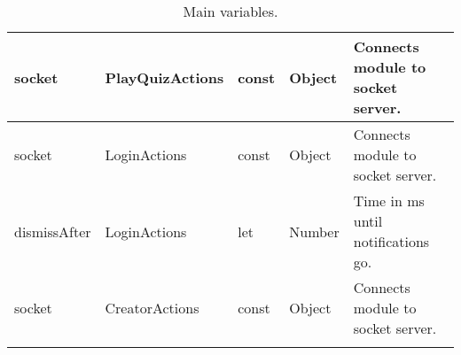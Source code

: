 \begin{longtable}{|l|l|l|l|l|}
socket                              & PlayQuizActions                      & const                              & Object                               & Connects module to socket server.     \\ \hline
socket                              & LoginActions                         & const                              & Object                               & Connects module to socket server.     \\ \hline
dismissAfter                        & LoginActions                         & let                                & Number                               & Time in ms until notifications go.    \\ \hline
socket                              & CreatorActions                       & const                              & Object                               & Connects module to socket server.     \\ \hline
\caption{Main variables.}
\end{longtable}


